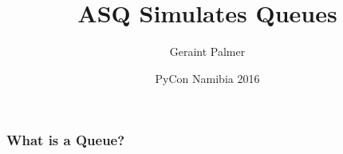 \documentclass{beamer}
\title
{ASQ Simulates Queues}
\author{Geraint Palmer}
\date{PyCon Namibia 2016}
\begin{document}
\frame{\titlepage}

\begin{frame}
\frametitle{What is a Queue?}
\begin{figure}
  
\end{figure}
\end{frame}
\end{document}
